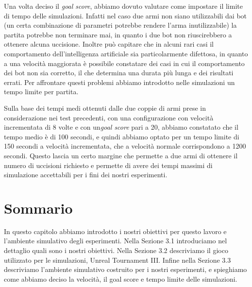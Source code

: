 \documentclass[12pt, italian]{toptesi}
\begin{document}
Una volta deciso il \emph{goal score}, abbiamo dovuto valutare come impostare il limite di tempo delle simulazioni. Infatti nel caso due armi non siano utilizzabili dai bot (un certa combinazione di parametri potrebbe rendere l'arma inutilizzabile) la partita potrebbe non terminare mai, in quanto i due bot non riuscirebbero a ottenere alcuna uccisione. Inoltre può capitare che in alcuni rari casi il comportamento dell'intelligenza artificiale sia particolarmente difettosa, in quanto a una velocità maggiorata è possibile constatare dei casi in cui il comportamento dei bot non sia corretto, il che determina una durata più lunga e dei risultati errati.
Per affrontare questi problemi abbiamo introdotto nelle simulazioni un tempo limite per partita.

Sulla base dei tempi medi ottenuti dalle due coppie di armi prese in considerazione nei test precedenti, con una configurazione con velocità incrementata di 8 volte e con un\emph{goal score} pari a 20, abbiamo constatato che il tempo medio è di 100 secondi, e quindi abbiamo optato per un tempo limite di 150 secondi a velocità incrementata, che a velocità normale corrispondono a 1200 secondi.
Questo lascia un certo margine che permette a due armi di ottenere il numero di uccisioni richiesto e permette di avere dei tempi massimi di simulazione accettabili per i fini dei nostri esperimenti.

\section{Sommario}
In questo capitolo abbiamo introdotto i nostri obiettivi per questo lavoro e l'ambiente simulativo degli esperimenti.
Nella Sezione 3.1 introduciamo nel dettaglio quali sono i nostri obiettivi.
Nella Sezione 3.2 descriviamo il gioco utilizzato per le simulazioni, Unreal Tournament III.
Infine nella Sezione 3.3 descriviamo l'ambiente simulativo costruito per i nostri esperimenti, e spieghiamo come abbiamo deciso la velocità, il goal score e tempo limite delle simulazioni.
\end{document}
